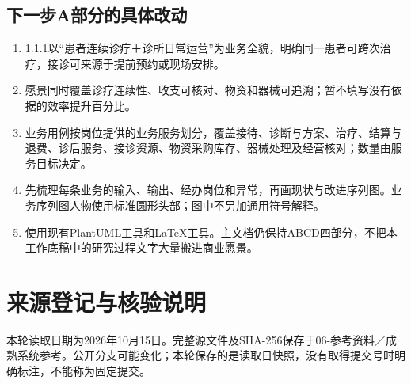 \documentclass[UTF8,a4paper,zihao=-4,fontset=none]{ctexart}
\begin{document}
\subsection{下一步A部分的具体改动}
\begin{enumerate}
\item 1.1.1以“患者连续诊疗＋诊所日常运营”为业务全貌，明确同一患者可跨次治疗，接诊可来源于提前预约或现场安排。
\item 愿景同时覆盖诊疗连续性、收支可核对、物资和器械可追溯；暂不填写没有依据的效率提升百分比。
\item 业务用例按岗位提供的业务服务划分，覆盖接待、诊断与方案、治疗、结算与退费、诊后服务、接诊资源、物资采购库存、器械处理及经营核对；数量由服务目标决定。
\item 先梳理每条业务的输入、输出、经办岗位和异常，再画现状与改进序列图。业务序列图人物使用标准圆形头部；图中不另加通用符号解释。
\item 使用现有PlantUML工具和LaTeX工具。主文档仍保持ABCD四部分，不把本工作底稿中的研究过程文字大量搬进商业愿景。
\end{enumerate}
\clearpage\section{来源登记与核验说明}
本轮读取日期为2026年10月15日。完整源文件及SHA-256保存于06-参考资料／成熟系统参考。公开分支可能变化；本轮保存的是读取日快照，没有取得提交号时明确标注，不能称为固定提交。
\end{document}
